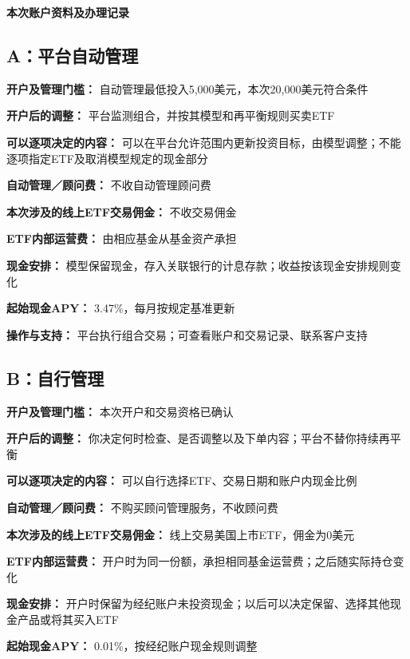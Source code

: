 \documentclass[UTF8,fontset=none,11pt,a4paper]{ctexart}
\begin{document}
{\noindent\fontsize{20}{25}\selectfont\bfseries 本次账户资料及办理记录\par}
\vspace{10pt}
\subsection*{A：平台自动管理}
\textbf{开户及管理门槛：} 自动管理最低投入5,000美元，本次20,000美元符合条件


\textbf{开户后的调整：} 平台监测组合，并按其模型和再平衡规则买卖ETF


\textbf{可以逐项决定的内容：} 可以在平台允许范围内更新投资目标，由模型调整；不能逐项指定ETF及取消模型规定的现金部分


\textbf{自动管理／顾问费：} 不收自动管理顾问费


\textbf{本次涉及的线上ETF交易佣金：} 不收交易佣金


\textbf{ETF内部运营费：} 由相应基金从基金资产承担


\textbf{现金安排：} 模型保留现金，存入关联银行的计息存款；收益按该现金安排规则变化


\textbf{起始现金APY：} 3.47\%，每月按规定基准更新


\textbf{操作与支持：} 平台执行组合交易；可查看账户和交易记录、联系客户支持


\subsection*{B：自行管理}
\textbf{开户及管理门槛：} 本次开户和交易资格已确认


\textbf{开户后的调整：} 你决定何时检查、是否调整以及下单内容；平台不替你持续再平衡


\textbf{可以逐项决定的内容：} 可以自行选择ETF、交易日期和账户内现金比例


\textbf{自动管理／顾问费：} 不购买顾问管理服务，不收顾问费


\textbf{本次涉及的线上ETF交易佣金：} 线上交易美国上市ETF，佣金为0美元


\textbf{ETF内部运营费：} 开户时为同一份额，承担相同基金运营费；之后随实际持仓变化


\textbf{现金安排：} 开户时保留为经纪账户未投资现金；以后可以决定保留、选择其他现金产品或将其买入ETF


\textbf{起始现金APY：} 0.01\%，按经纪账户现金规则调整
\end{document}
